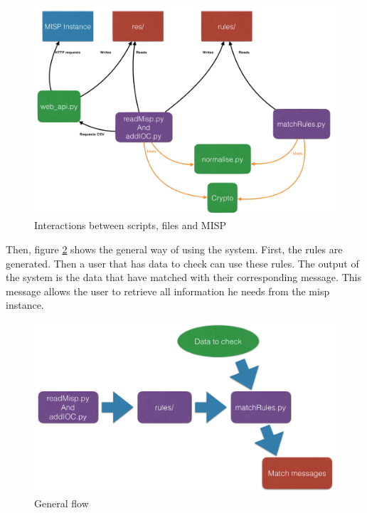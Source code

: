 \documentclass{eplmastersthesis}
\begin{document}
\begin{figure}
\centering
\includegraphics[scale=0.4]{res/interactions}
\caption{Interactions between scripts, files and MISP}
\label{interactions}
\end{figure}

Then, figure \ref{general-flow} shows the general way of using the system. First, the rules are generated. Then a user that has data to check can use these rules. The output of the system is the data that have matched with their corresponding message. This message allows the user to retrieve all information he needs from the \gls{misp} instance.\\

\begin{figure}
\centering
\includegraphics[scale=0.4]{res/generalFlow}
\caption{General flow}
\label{general-flow}
\end{figure}
\end{document}
